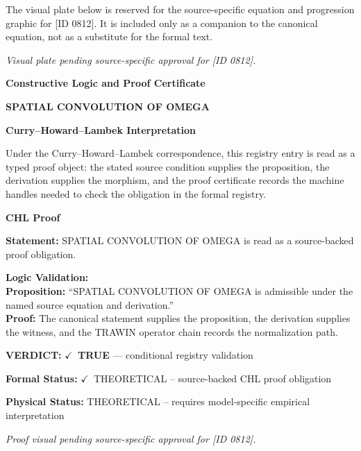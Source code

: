 \begingroup\footnotesize\sloppy
The visual plate below is reserved for the source-specific equation and progression graphic for [ID 0812]. It is included only as a companion to the canonical equation, not as a substitute for the formal text.
\par\endgroup
\begingroup\footnotesize\itshape
Visual plate pending source-specific approval for [ID 0812].
\par\endgroup

\clearpage
\begingroup\tzpsupportsetup
\noindent\textbf{\fontsize{10.8pt}{12.8pt}\selectfont [ID 0812] Constructive Logic and Proof Certificate}\par
\noindent\textbf{\fontsize{10pt}{12pt}\selectfont SPATIAL CONVOLUTION OF OMEGA}\par
\vspace{0.45em}
\begingroup
\footnotesize
\setlength{\parskip}{0.22em}
\setlength{\parindent}{0pt}
\noindent\textbf{Curry--Howard--Lambek Interpretation}\par
Under the Curry--Howard--Lambek correspondence, this registry entry is read as a typed proof
object: the stated source condition supplies the proposition, the derivation supplies the
morphism, and the proof certificate records the machine handles needed to check the obligation
in the formal registry.

\vspace{0.45em}
\noindent\textbf{CHL Proof}\par
\textbf{Statement:} SPATIAL CONVOLUTION OF OMEGA is read as a source-backed proof obligation.

\textbf{Logic Validation:}\\
\textbf{Proposition:} ``SPATIAL CONVOLUTION OF OMEGA is admissible under the named source equation and derivation.''\\
\textbf{Proof:} The canonical statement supplies the proposition, the derivation supplies the witness, and the TRAWIN operator chain records the normalization path.

\textbf{VERDICT:} \ensuremath{\checkmark}\ \textbf{TRUE} --- conditional registry validation

\textbf{Formal Status:} \ensuremath{\checkmark}\ THEORETICAL -- source-backed CHL proof obligation

\textbf{Physical Status:} THEORETICAL -- requires model-specific empirical interpretation
\par\vspace{0.45em}
\par
\vfill
\begingroup\footnotesize\itshape
Proof visual pending source-specific approval for [ID 0812].
\par\endgroup
\vfill
\endgroup
\endgroup
